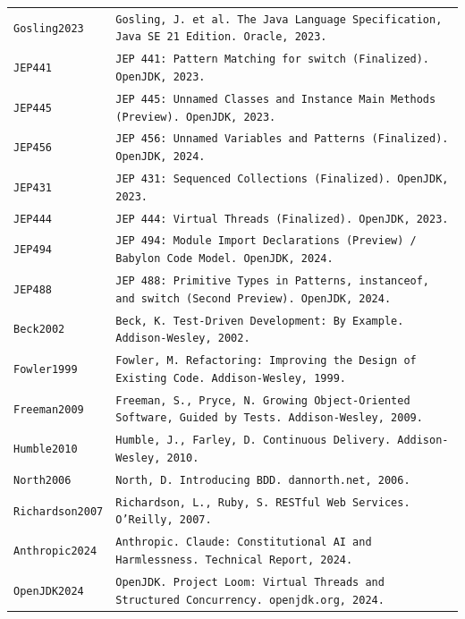 \documentclass[11pt]{article}
\begin{document}
\begin{table}[h]
\centering
\begin{tabular}{|l|l|}
\hline
\texttt{Gosling2023} & \texttt{Gosling, J. et al. The Java Language Specification, Java SE 21 Edition. Oracle, 2023.} \\
\texttt{JEP441} & \texttt{JEP 441: Pattern Matching for switch (Finalized). OpenJDK, 2023.} \\
\texttt{JEP445} & \texttt{JEP 445: Unnamed Classes and Instance Main Methods (Preview). OpenJDK, 2023.} \\
\texttt{JEP456} & \texttt{JEP 456: Unnamed Variables and Patterns (Finalized). OpenJDK, 2024.} \\
\texttt{JEP431} & \texttt{JEP 431: Sequenced Collections (Finalized). OpenJDK, 2023.} \\
\texttt{JEP444} & \texttt{JEP 444: Virtual Threads (Finalized). OpenJDK, 2023.} \\
\texttt{JEP494} & \texttt{JEP 494: Module Import Declarations (Preview) / Babylon Code Model. OpenJDK, 2024.} \\
\texttt{JEP488} & \texttt{JEP 488: Primitive Types in Patterns, instanceof, and switch (Second Preview). OpenJDK, 2024.} \\
\texttt{Beck2002} & \texttt{Beck, K. Test-Driven Development: By Example. Addison-Wesley, 2002.} \\
\texttt{Fowler1999} & \texttt{Fowler, M. Refactoring: Improving the Design of Existing Code. Addison-Wesley, 1999.} \\
\texttt{Freeman2009} & \texttt{Freeman, S., Pryce, N. Growing Object-Oriented Software, Guided by Tests. Addison-Wesley, 2009.} \\
\texttt{Humble2010} & \texttt{Humble, J., Farley, D. Continuous Delivery. Addison-Wesley, 2010.} \\
\texttt{North2006} & \texttt{North, D. Introducing BDD. dannorth.net, 2006.} \\
\texttt{Richardson2007} & \texttt{Richardson, L., Ruby, S. RESTful Web Services. O'Reilly, 2007.} \\
\texttt{Anthropic2024} & \texttt{Anthropic. Claude: Constitutional AI and Harmlessness. Technical Report, 2024.} \\
\texttt{OpenJDK2024} & \texttt{OpenJDK. Project Loom: Virtual Threads and Structured Concurrency. openjdk.org, 2024.} \\
\hline
\end{tabular}
\end{table}
\end{document}
